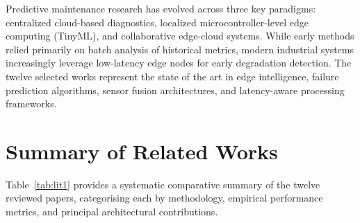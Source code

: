 \documentclass[12pt,a4paper]{report}
\begin{document}
Predictive maintenance research has evolved across three key paradigms: centralized cloud-based diagnostics, localized microcontroller-level edge computing (TinyML), and collaborative edge-cloud systems. While early methods relied primarily on batch analysis of historical metrics, modern industrial systems increasingly leverage low-latency edge nodes for early degradation detection. The twelve selected works represent the state of the art in edge intelligence, failure prediction algorithms, sensor fusion architectures, and latency-aware processing frameworks.

\section{Summary of Related Works}
Table~\ref{tab:lit1} provides a systematic comparative summary of the twelve reviewed papers, categorising each by methodology, empirical performance metrics, and principal architectural contributions.

\clearpage
{}
\end{document}
